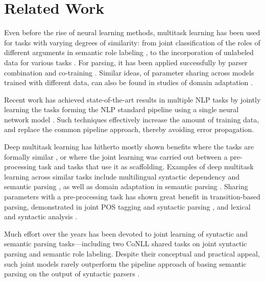 \documentclass[11pt,a4paper]{article}
\newcommand{\oa}[1]{\footnote{\color{red}OA: #1}}
\begin{document}
\section{Related Work}\label{sec:related_work}
Even before the rise of neural learning methods,
multitask learning has been used for tasks with varying degrees of similarity:
from joint classification of the roles of different arguments in semantic role labeling \cite{toutanova2005joint}, 
to the incorporation of unlabeled data for various tasks \cite{ando2005framework}.
For parsing, it has been applied successfully by
parser combination and co-training \cite{mcclosky2010automatic,baucom2013domain}.
Similar ideas, of parameter sharing across models trained with different data,
can also be found in studies of domain adaptation \cite{W06-1615,P07-1033,K17-1040}.

Recent work has achieved state-of-the-art results in multiple NLP tasks
by jointly learning the tasks forming the NLP standard pipeline using 
a single neural network model \cite{collobert2011natural,D17-1206}.
Such techniques effectively increase the amount of training data,
and replace the common pipeline approach, thereby avoiding error propagation.

Deep multitask learning has hitherto mostly shown benefits where the tasks
are formally similar \cite{P15-1166,P16-2038,D17-1134},
or where the joint learning was carried out between a pre-processing task and tasks that use it
as scaffolding.
Examples of deep multitask learning across similar tasks include 
multilingual syntactic dependency \cite{Q16-1031,guo2016exploiting}
and semantic parsing \cite{duong2017multilingual},
as well as domain adaptation in semantic parsing \cite{herzig-berant:2017:Short,W17-2607}.
Sharing parameters with a pre-processing task
has shown great benefit in transition-based parsing, demonstrated in
joint POS tagging and syntactic parsing
\cite{bohnet2012transition,Zhang2016StackpropagationIR}, and
lexical and syntactic analysis \cite{constant-nivre:2016:P16-1,more2016joint}.

Much effort over the years has been devoted to joint learning of syntactic
and semantic parsing tasks---including
two CoNLL shared tasks \cite{surdeanu2008conll,hajivc2009conll} on joint syntactic
parsing and semantic role labeling.
Despite their conceptual and practical appeal, such joint models rarely outperform
the pipeline approach of basing semantic parsing on the output of syntactic parsers
\cite{lluis2008joint,henderson2013multilingual,D15-1169,swayamdipta-EtAl:2016:CoNLL}.
\end{document}
